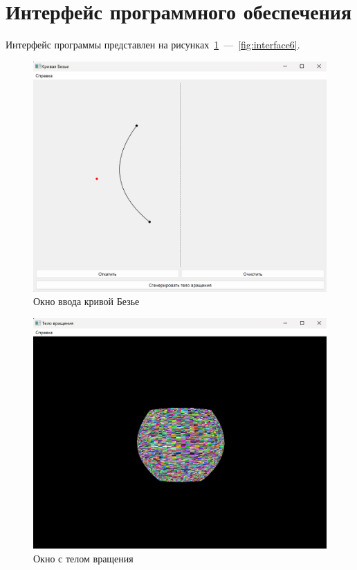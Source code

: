 \section{Интерфейс программного обеспечения}

Интерфейс программы представлен на рисунках~\ref{fig:interface1}~---~\ref{fig:interface6}.

\begin{figure}[H]
    \centering
    \includegraphics[width=0.8\linewidth]{images/interface/bezier.png}
    \caption{Окно ввода кривой Безье}
    \label{fig:interface1}
\end{figure}

\begin{figure}[H]
    \centering
    \includegraphics[width=0.8\linewidth]{images/interface/gen_body.png}
    \caption{Окно с телом вращения}
    \label{fig:interface2}
\end{figure}

